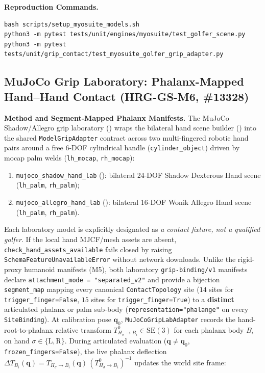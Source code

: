 \documentclass[11pt,a4paper]{article}
\begin{document}
\textbf{Reproduction Commands.}
\begin{verbatim}
bash scripts/setup_myosuite_models.sh
python3 -m pytest tests/unit/engines/myosuite/test_golfer_scene.py
python3 -m pytest tests/unit/grip_contact/test_myosuite_golfer_grip_adapter.py
\end{verbatim}

\subsection{MuJoCo Grip Laboratory: Phalanx-Mapped Hand--Hand Contact (HRG-GS-M6, \#13328)}
\textbf{Method and Segment-Mapped Phalanx Manifests.}
The MuJoCo Shadow/Allegro grip laboratory () wraps the bilateral hand scene builder () into the shared \texttt{ModelGripAdapter} contract across two multi-fingered robotic hand pairs around a free $6$-DOF cylindrical handle (\texttt{cylinder\_object}) driven by mocap palm welds (\texttt{lh\_mocap}, \texttt{rh\_mocap}):
\begin{enumerate}[leftmargin=*,noitemsep]
\item \texttt{mujoco\_shadow\_hand\_lab} (): bilateral 24-DOF Shadow Dexterous Hand scene (\texttt{lh\_palm}, \texttt{rh\_palm});
\item \texttt{mujoco\_allegro\_hand\_lab} (): bilateral 16-DOF Wonik Allegro Hand scene (\texttt{lh\_palm}, \texttt{rh\_palm}).
\end{enumerate}
Each laboratory model is explicitly designated as \emph{a contact fixture, not a qualified golfer}. If the local hand MJCF/mesh assets are absent, \texttt{check\_hand\_assets\_available} fails closed by raising \texttt{SchemaFeatureUnavailableError} without network downloads.
Unlike the rigid-proxy humanoid manifests (M5), both laboratory \texttt{grip-binding/v1} manifests declare \texttt{attachment\_mode = "separated\_v2"} and provide a bijection \texttt{segment\_map} mapping every canonical \texttt{ContactTopology} site ($14$ sites for \texttt{trigger\_finger=False}, $15$ sites for \texttt{trigger\_finger=True}) to a \textbf{distinct} articulated phalanx or palm sub-body (\texttt{representation="phalange"} on every \texttt{SiteBinding}). At calibration pose $\mathbf{q}_0$, \texttt{MuJoCoGripLabAdapter} records the hand-root-to-phalanx relative transform $T_{H_{\sigma} \to B_i}^{0} \in \mathrm{SE}(3)$ for each phalanx body $B_i$ on hand $\sigma \in \{\mathrm{L}, \mathrm{R}\}$. During articulated evaluation ($\mathbf{q} \neq \mathbf{q}_0$, \texttt{frozen\_fingers=False}), the live phalanx deflection $\Delta T_{B_i}(\mathbf{q}) = T_{H_{\sigma} \to B_i}(\mathbf{q})\,\left(T_{H_{\sigma} \to B_i}^{0}\right)^{-1}$ updates the world site frame:
\end{document}
